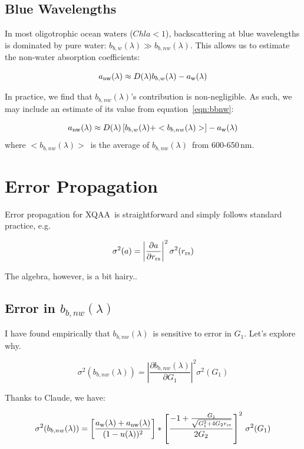 \documentclass{article}
\newcommand{\rrs}{\ensuremath{r_{\rm rs}}}
\newcommand{\bbw}{\ensuremath{b_{b,w}(\lambda)}} %
\newcommand{\bbnw}{\ensuremath{b_{b,nw}(\lambda)}} %
\newcommand{\aw}{\ensuremath{a_{\rm w} (\lambda)}}
\newcommand{\anw}{\ensuremath{a_{\rm nw} (\lambda)}}
\newcommand{\chla}{\ensuremath{Chla}}
\newcommand{\dl}{\ensuremath{D(\lambda)}}
\newcommand{\avgbbnw}{\ensuremath{<\bbnw>}}
\newcommand{\name}{XQAA}
\newcommand{\claude}{Claude}
\begin{document}
\subsection{Blue Wavelengths}

In most oligotrophic ocean waters ($\chla < 1$), 
backscattering at blue wavelengths
is dominated by pure water: $\bbw \gg \bbnw$.
This allows us to estimate the non-water absorption
coefficients:

\begin{equation}
    \anw \approx \dl \bbw - \aw
    \label{eqn:anw}
\end{equation}

In practice, we find that \bbnw's contribution
is non-negligible.  As such, we may include an estimate of its value from equation~\ref{eqn:bbnw}:

\begin{equation}
    \anw \approx \dl \left [ \bbw + \avgbbnw \right ] - \aw
    \label{eqn:anw_bbnw}
\end{equation}
where \avgbbnw\ is the average 
of \bbnw\ from 600-650\,nm.

\section{Error Propagation}

Error propagation for \name\ is straightforward and simply follows
standard practice, e.g.

\begin{equation}
    \sigma^2(a) = \left | \frac{\partial a}{\partial \rrs} \right |^2 \sigma^2(\rrs)
\end{equation}

The algebra, however, is a bit hairy..

\subsection{Error in \bbnw}

I have found empirically that \bbnw\ is sensitive to error in $G_1$.
Let's explore why.


\begin{equation}
    \sigma^2(\bbnw) = \left | \frac{\partial \bbnw}{\partial G_1} \right |^2 \sigma^2(G_1)
\end{equation}

Thanks to \claude, we have:

\begin{equation}
    \sigma^2(\bbnw) = \left [ \frac{\aw  + \anw} {(1 - u(\lambda))^2} \right ] 
      * \left [ \frac{-1 + \frac{G_1}{\sqrt{G_1^2 + 4G_2 \rrs}}}{2G_2} \right ]^2 \,  \sigma^2(G_1)
\end{equation}
\end{document}
